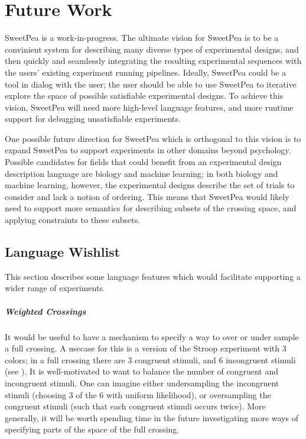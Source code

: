 \chapter{Future Work}

SweetPea is a work-in-progress. The ultimate vision for SweetPea is to be a convinient system for describing many diverse types of experimental designs, and then quickly and seamlessly integrating the resulting experimental sequences with the users' existing experiment running pipelines. Ideally, SweetPea could be a tool in dialog with the user; the user should be able to use SweetPea to iterative explore the space of possible satisfiable experimental designs. To achieve this vision, SweetPea will need more high-level language features, and more runtime support for debugging unsatisfiable experiments.

One possible future direction for SweetPea which is orthogonal to this vision is to expand SweetPea to support experiments in other domains beyond psychology. Possible candidates for fields that could benefit from an experimental design description language are biology and machine learning; in both biology and machine learning, however, the experimental designs describe the set of trials to consider and lack a notion of ordering. This means that SweetPea would likely need to support more semantics for describing subsets of the crossing space, and applying constraints to these subsets.

\section{Language Wishlist}

This section describes some language features which would facilitate supporting a wider range of experiments.

\paragraph*{Weighted Crossings}
It would be useful to have a mechanism to specify a way to over or under sample a full crossing. A usecase for this is a version of the Stroop experiment with 3 colors; in a full crossing there are 3 congruent stimuli, and 6 incongruent stimuli (see ). It is well-motivated to want to balance the number of congruent and incongruent stimuli. One can imagine either undersampling the incongruent stimuli (choosing 3 of the 6 with uniform likelihood), or oversampling the congruent stimuli (such that each congruent stimuli occurs twice). More generally, it will be worth spending time in the future investigating more ways of specifying parts of the space of the full crossing.

